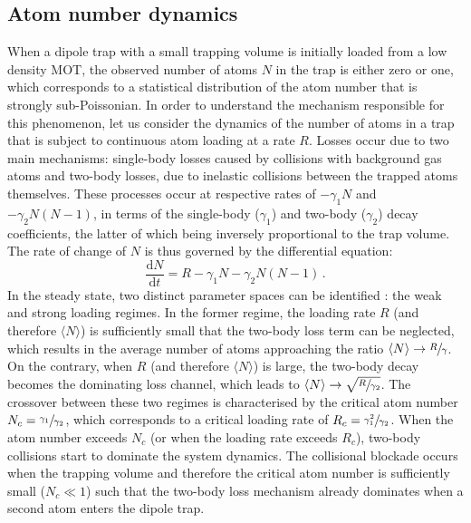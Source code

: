 \documentclass[../Thesis-IJspeert.tex]{subfiles}
\begin{document}
\subsection{Atom number dynamics}
When a dipole trap with a small trapping volume is initially loaded from a low density MOT, the observed number of atoms $N$ in the trap is either zero or one, which corresponds to a statistical distribution of the atom number that is strongly sub-Poissonian. In order to understand the mechanism responsible for this phenomenon, let us consider the dynamics of the number of atoms in a trap that is subject to continuous atom loading at a rate $R$. Losses occur due to two main mechanisms: single-body losses caused by collisions with background gas atoms and two-body losses, due to inelastic collisions between the trapped atoms themselves. These processes occur at respective rates of $-\gamma_1 N$ and $-\gamma_2 N(N-1)$, in terms of the single-body ($\gamma_1$) and two-body ($\gamma_2$) decay coefficients, the latter of which being inversely proportional to the trap volume. The rate of change of $N$ is thus governed by the differential equation:
\begin{equation}
\frac{\mathrm{d}N}{\mathrm{d}t} = R - \gamma_1 N - \gamma_2 N (N-1)\,.
\end{equation}
In the steady state, two distinct parameter spaces can be identified \cite{Schlosser2002}: the weak and strong loading regimes. In the former regime, the loading rate $R$ (and therefore $\langle N \rangle$) is sufficiently small that the two-body loss term can be neglected, which results in the average number of atoms approaching the ratio $\langle N \rangle \rightarrow \sfrac{R}{\gamma} $. On the contrary, when $R$ (and therefore $\langle N \rangle$) is large, the two-body decay becomes the dominating loss channel, which leads to $\langle N \rangle \rightarrow \sqrt{ \sfrac{R}{\gamma_2} }$. The crossover between these two regimes is characterised by the critical atom number $ N_c = \sfrac{\gamma_1}{\gamma_2} $, which corresponds to a critical loading rate of $ R_c = \sfrac{\gamma_1^2}{\gamma_2} $. When the atom number exceeds $N_c$ (or when the loading rate exceeds $ R_c $), two-body collisions start to dominate the system dynamics. The collisional blockade occurs when the trapping volume and therefore the critical atom number is sufficiently small ($N_c \ll 1$) such that the two-body loss mechanism already dominates when a second atom enters the dipole trap.
\end{document}
